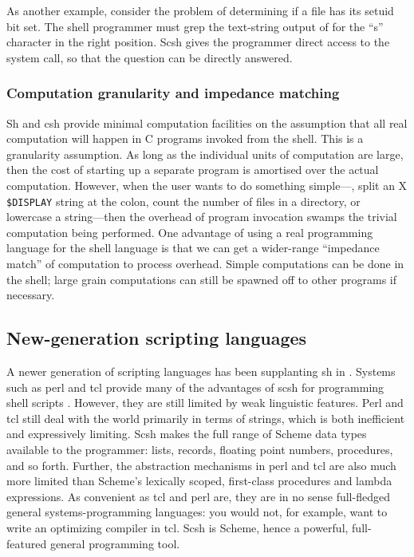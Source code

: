 As another example, consider the problem of determining if a file has its
setuid bit set.
The shell programmer must grep the text-string output of  
for the ``s'' character in the right position.
Scsh gives the programmer direct access to the  system call,
so that the question can be directly answered.

\subsubsection*{Computation granularity and impedance matching}
Sh and csh provide minimal computation facilities on the assumption that all
real computation will happen in C programs invoked from the shell.
This is a granularity assumption.
As long as the individual units of computation are large, then the cost of
starting up a separate program is amortised over the actual computation.
However, when the user wants to do something simple---\eg, split an X
\verb|$DISPLAY| string at the colon,
count the number of files in a directory, 
or lowercase a string---then the overhead of program invocation
swamps the trivial computation being performed.
One advantage of using a real programming language for the shell language is
that we can get a wider-range ``impedance match'' of computation to process
overhead.
Simple computations can be done in the shell; 
large grain computations can still be spawned off
to other programs if necessary.

\subsection{New-generation scripting languages}
A newer generation of scripting languages has been supplanting sh in {\Unix}.
Systems such as perl and tcl provide many of the advantages of scsh for
programming shell scripts \cite{perl, tcl}.
However, they are still limited by weak linguistic features.
Perl and tcl still deal with the world primarily in terms of strings,
which is both inefficient and expressively limiting.
Scsh makes the full range of Scheme data types available to the programmer:
lists, records, floating point numbers, procedures, and so forth.
Further, the abstraction mechanisms in perl and tcl are also much more limited
than Scheme's lexically scoped, first-class procedures and lambda expressions.
As convenient as tcl and perl are, they are in no sense full-fledged
general systems-programming languages: you would not, for example, want
to write an optimizing compiler in tcl.
Scsh is Scheme, hence a powerful, full-featured general programming tool.

